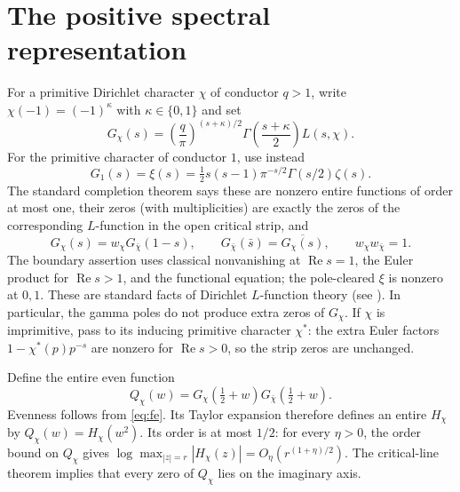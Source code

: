 \documentclass[11pt]{article}
\theoremstyle{remark}\newtheorem{remark}[theorem]{Remark}
\newcommand{\Rea}{\operatorname{Re}}
\begin{document}
\section{The positive spectral representation}
For a primitive Dirichlet character $\chi$ of conductor $q>1$, write $\chi(-1)=(-1)^\kappa$ with $\kappa\in\{0,1\}$ and set
\[
 G_\chi(s)=\left(\frac q\pi\right)^{(s+\kappa)/2}
 \Gamma\left(\frac{s+\kappa}{2}\right)L(s,\chi).
\]
For the primitive character of conductor $1$, use instead
\[
 G_1(s)=\xi(s)=\tfrac12 s(s-1)\pi^{-s/2}\Gamma(s/2)\zeta(s).
\]
The standard completion theorem says these are nonzero entire functions of order at most one, their zeros (with multiplicities) are exactly the zeros of the corresponding $L$-function in the open critical strip, and
\begin{equation}\label{eq:fe}
 G_\chi(s)=w_\chi G_{\bar\chi}(1-s),\qquad
 G_{\bar\chi}(\bar s)=\overline{G_\chi(s)},\qquad
 w_\chi w_{\bar\chi}=1.
\end{equation}
The boundary assertion uses classical nonvanishing at $\Rea s=1$, the Euler product for $\Rea s>1$, and the functional equation; the pole-cleared $\xi$ is nonzero at $0,1$. These are standard facts of Dirichlet $L$-function theory (see \cite{davenport,dlmf}). In particular, the gamma poles do not produce extra zeros of $G_\chi$. If $\chi$ is imprimitive, pass to its inducing primitive character $\chi^*$: the extra Euler factors $1-\chi^*(p)p^{-s}$ are nonzero for $\Rea s>0$, so the strip zeros are unchanged.

Define the entire even function
\[
 Q_\chi(w)=G_\chi(\tfrac12+w)G_{\bar\chi}(\tfrac12+w).
\]
Evenness follows from \eqref{eq:fe}. Its Taylor expansion therefore defines an entire $H_\chi$ by $Q_\chi(w)=H_\chi(w^2)$. Its order is at most $1/2$: for every $\eta>0$, the order bound on $Q_\chi$ gives $\log\max_{|z|=r}|H_\chi(z)|=O_\eta(r^{(1+\eta)/2})$. The critical-line theorem implies that every zero of $Q_\chi$ lies on the imaginary axis.
\end{document}
